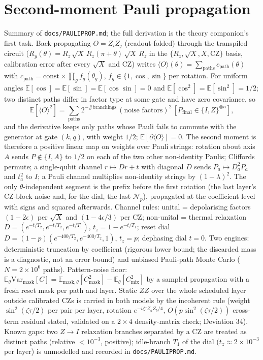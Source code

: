 \documentclass[aps,prxquantum,reprint,superscriptaddress,nofootinbib,longbibliography,amsmath,amssymb]{revtex4-2}
\newcommand{\Var}{\mathrm{Var}}
\newcommand{\Cmix}{C_{\mathrm{mix}}}
\newcommand{\Np}{\mathcal{N}_p}
\begin{document}
\section{Second-moment Pauli propagation}\label{app:pauliprop}
Summary of \texttt{docs/PAULIPROP.md}; the full derivation is the theory companion's first task. Back-propagating $O = Z_iZ_j$ (readout-folded) through the transpiled circuit ($R_y(\theta) = R_z\,\sqrt{X}\,R_z(\pi+\theta)\,\sqrt{X}\,R_z$ in the $\{R_z, \sqrt{X}, X, \mathrm{CZ}\}$ basis, calibration error after every $\sqrt{X}$ and CZ) writes $\langle O\rangle(\theta) = \sum_{\mathrm{paths}} c_{\mathrm{path}}(\theta)$ with $c_{\mathrm{path}} = \mathrm{const}\times\prod_g f_g(\theta_g)$, $f_g \in \{1, \cos, \sin\}$ per rotation. For uniform angles $\mathbb{E}[\cos] = \mathbb{E}[\sin] = \mathbb{E}[\cos\sin] = 0$ and $\mathbb{E}[\cos^2] = \mathbb{E}[\sin^2] = 1/2$; two distinct paths differ in factor type at some gate and have zero covariance, so
\[
\mathbb{E}[\langle O\rangle^2] = \sum_{\mathrm{paths}} 2^{-\#\mathrm{branchings}}\,(\text{noise factors})^2\,[P_{\mathrm{final}} \in \{I, Z\}^{\otimes n}],
\]
and the derivative keeps only paths whose Pauli fails to commute with the generator at gate $(k, q)$, with weight $1/2$; $\mathbb{E}[\partial\langle O\rangle] = 0$. The second moment is therefore a positive linear map on weights over Pauli strings: rotation about axis $A$ sends $P \notin \{I, A\}$ to $1/2$ on each of the two other non-identity Paulis; Cliffords permute; a single-qubit channel $r \mapsto Dr + t$ with diagonal $D$ sends $P_a \mapsto D_a^2 P_a$ and $t_a^2$ to $I$; a Pauli channel multiplies non-identity strings by $(1-\lambda)^2$. The only $\theta$-independent segment is the prefix before the first rotation (the last layer's CZ-block noise and, for the dial, the last $\Np$), propagated at the coefficient level with signs and squared afterwards. Channel rules: unital = depolarising factors $(1 - 2\epsilon)$ per $\sqrt X$ and $(1 - 4\epsilon/3)$ per CZ; non-unital = thermal relaxation $D = (e^{-t/T_2}, e^{-t/T_2}, e^{-t/T_1})$, $t_z = 1 - e^{-t/T_1}$; reset dial $D = (1-p)(e^{-400/T_2}, e^{-400/T_2}, 1)$, $t_z = p$; dephasing dial $t = 0$. Two engines: deterministic truncation by coefficient (rigorous lower bound; the discarded mass is a diagnostic, not an error bound) and unbiased Pauli-path Monte Carlo ($N = 2\times10^6$ paths). Pattern-noise floor: $\mathbb{E}_\theta\Var_{\mathrm{mask}}[C] = \mathbb{E}_{\mathrm{mask},\theta}[C_{\mathrm{mask}}^2] - \mathbb{E}_\theta[\Cmix^2]$ by a sampled propagation with a fresh reset mask per path and layer. Static $ZZ$ over the whole scheduled layer outside calibrated CZs is carried in both models by the incoherent rule (weight $\sin^2(\zeta\tau/2)$ per pair per layer, rotation $e^{-i\zeta\tau Z_aZ_b/4}$, $O(p\sin^2(\zeta\tau/2))$ cross-term residual stated, validated on a $2\times4$ density-matrix check; Deviation 34). Known gaps: two $Z \to I$ relaxation branches separated by a CZ are treated as distinct paths (relative $< 10^{-3}$, positive); idle-branch $T_1$ of the dial ($t_z \approx 2\times10^{-3}$ per layer) is unmodelled and recorded in \texttt{docs/PAULIPROP.md}.
\end{document}
